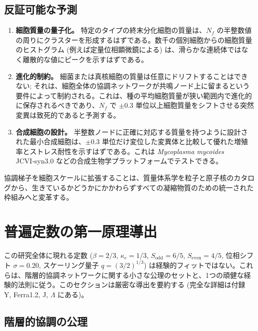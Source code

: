 \documentclass[11pt,a4paper]{article}
\theoremstyle{remark}
\begin{document}
	\subsection{反証可能な予測}
	\begin{enumerate}
		\item \textbf{細胞質量の量子化。} 特定のタイプの終末分化細胞の質量は、\(N_f\) の半整数値の周りにクラスターを形成するはずである。数千の個別細胞からの細胞質量のヒストグラム (例えば定量位相顕微鏡による) は、滑らかな連続体ではなく離散的な値にピークを示すはずである。
		\item \textbf{進化的制約。} 細菌または真核細胞の質量は任意にドリフトすることはできない; それは、細胞全体の協調ネットワークが共鳴ノード上に留まるという要件によって制約される。これは、種の平均細胞質量が狭い範囲内で進化的に保存されるべきであり、\(N_f\) で \(\pm 0.3\) 単位以上細胞質量をシフトさせる突然変異は致死的であると予測する。
		\item \textbf{合成細胞の設計。} 半整数ノードに正確に対応する質量を持つように設計された最小合成細胞は、\(\pm 0.3\) 単位だけ変位した変異体と比較して優れた増殖率とストレス耐性を示すはずである。これは \textit{Mycoplasma mycoides} JCVI‑syn3.0 などの合成生物学プラットフォームでテストできる。
	\end{enumerate}
	
	協調梯子を細胞スケールに拡張することは、質量体系学を粒子と原子核のカタログから、生きているかどうかにかかわらずすべての凝縮物質のための統一された枠組みへと変革する。
	
	\section{普遍定数の第一原理導出}
	\label{sec:first-principles}
	
	この研究全体に現れる定数 (\(\beta = 2/3\), \(\kappa_c = 1/3\), \(S_{\mathrm{odd}}=6/5\), \(S_{\mathrm{even}}=4/5\), 位相シフト \(\sigma = 0.20\), スケーリング量子 \(q = (3/2)^{1/3}\)) は経験的フィットではない。これらは、階層的協調ネットワークに関する小さな公理のセットと、1つの頑健な経験的法則に従う。このセクションは厳密な導出を要約する (完全な詳細は付録 Y, Ferra1.2, J, \(\Lambda\) にある)。
	
	\subsection{階層的協調の公理}
	
\end{document}
